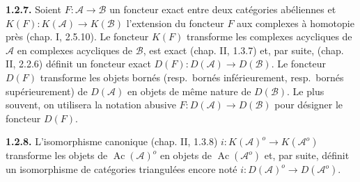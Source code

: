 \medskip\noindent\textbf{1.2.7.}\quad
Soient $F\colon\mathcal A\longrightarrow\mathcal B$ un foncteur exact entre
deux catégories abéliennes et
$K(F)\colon K(\mathcal A)\longrightarrow K(\mathcal B)$ l'extension du
foncteur $F$ aux complexes à homotopie près (chap. I, 2.5.10). Le foncteur
$K(F)$ transforme les complexes acycliques de $\mathcal A$ en complexes
acycliques de $\mathcal B$, est exact (chap. II, 1.3.7) et, par suite,
(chap. II, 2.2.6) définit un foncteur exact
$D(F)\colon D(\mathcal A)\longrightarrow D(\mathcal B)$. Le foncteur
$D(F)$ transforme les objets bornés (resp.\ bornés inférieurement, resp.\
bornés supérieurement) de $D(\mathcal A)$ en objets de même nature de
$D(\mathcal B)$. Le plus souvent, on utilisera la notation abusive
$F\colon D(\mathcal A)\longrightarrow D(\mathcal B)$ pour désigner le
foncteur $D(F)$.

\medskip\noindent\textbf{1.2.8.}\quad
L'isomorphisme canonique (chap. II, 1.3.8)
$i\colon K(\mathcal A)^o\longrightarrow K(\mathcal A^o)$ transforme les
objets de $\operatorname{Ac}(\mathcal A)^o$ en objets de
$\operatorname{Ac}(\mathcal A^o)$ et, par suite, définit un isomorphisme de
catégories triangulées encore noté
$i\colon D(\mathcal A)^o\longrightarrow D(\mathcal A^o)$.
\endgroup
